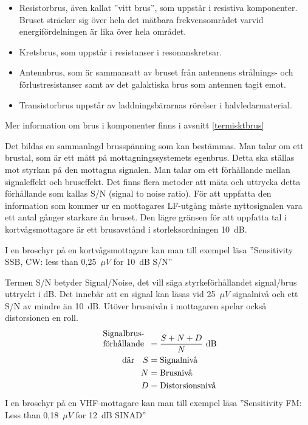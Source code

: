 \begin{itemize}
\item Resistorbrus, även kallat ''vitt brus'', som uppstår i resistiva
  komponenter.
  Bruset sträcker sig över hela det mätbara frekvensområdet varvid
  energifördelningen är lika över hela området.

\item Kretsbrus, som uppstår i resistanser i resonanskretsar.

\item Antennbrus, som är sammansatt av bruset från antennens
  strålnings- och förlustresistanser samt av det galaktiska brus som
  antennen tagit emot.

\item Transistorbrus uppstår av laddningsbärarnas rörelser i
  halvledarmaterial.
\end{itemize}

Mer information om brus i komponenter finns i avsnitt \ref{termisktbrus}

Det bildas en sammanlagd brusspänning som kan bestämmas.
Man talar om ett brustal, som är ett mått på mottagningssystemets egenbrus.
Detta ska ställas mot styrkan på den mottagna signalen.
Man talar om ett förhållande mellan signaleffekt och bruseffekt.
Det finns flera metoder att mäta och uttrycka detta förhållande som kallas
S/N (signal to noise ratio).
För att uppfatta den information som kommer ur en mottagares LF-utgång måste
nyttosignalen vara ett antal gånger starkare än bruset.
Den lägre gränsen för att uppfatta tal i kortvågsmottagare är ett brusavstånd
i storleksordningen 10~dB.



I en broschyr på en kortvågsmottagare kan man till exempel läsa
''Sensitivity SSB, CW: less than 0,25~\(\mu V\) for 10~dB S/N''

Termen S/N betyder Signal/Noise, det vill säga styrkeförhållandet signal/brus
uttryckt i dB.
Det innebär att en signal kan läsas vid 25~\(\mu V\) signalnivå och ett S/N av
mindre än 10~dB.
Utöver brusnivån i mottagaren spelar också distorsionen en roll.
\begin{align*}
  \begin{array}[b]{l}
    \text{Signalbrus-} \\
    \text{förhållande}
  \end{array} &= \frac{S + N + D}{N} \text{ dB} \\
  \text{där} \quad S &= \text{Signalnivå} \\
  N &= \text{Brusnivå} \\
  D &= \text{Distorsionsnivå} \\
\end{align*}
I en broschyr på en VHF-mottagare kan man till exempel läsa
''Sensitivity FM: Less than 0,18~\(\mu V\) for 12~dB SINAD''

